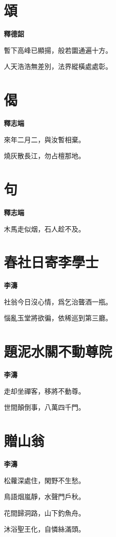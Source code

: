 \documentclass[12pt,a4paper]{ctexbook}
\begin{document}
\section{頌}
\textbf{釋德韶}\par\vspace{0.5em}
暫下高峰已顯揚，般若圜通遍十方。\par
人天浩浩無差別，法界縱橫處處彰。\par

\section{偈}
\textbf{釋志端}\par\vspace{0.5em}
來年二月二，與汝暫相棄。\par
燒灰散長江，勿占檀那地。\par

\section{句}
\textbf{釋志端}\par\vspace{0.5em}
木馬走似烟，石人趁不及。\par

\section{春社日寄李學士}
\textbf{李濤}\par\vspace{0.5em}
社翁今日沒心情，爲乞治聾酒一瓶。\par
惱亂玉堂將欲徧，依稀巡到第三廳。\par

\section{題泥水關不動尊院}
\textbf{李濤}\par\vspace{0.5em}
走却坐禪客，移將不動尊。\par
世間顛倒事，八萬四千門。\par

\section{贈山翁}
\textbf{李濤}\par\vspace{0.5em}
松蘿深處住，閑野不生愁。\par
鳥語烟嵐靜，水聲門戶秋。\par
花間歸洞路，山下釣魚舟。\par
沐浴聖王化，自憐絲滿頭。\par
\end{document}
